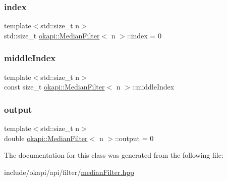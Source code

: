 \mbox{\label{classokapi_1_1MedianFilter_af5188b3df2e2f5cffed1b8b903ce1ef9}} 
\subsubsection{\texorpdfstring{index}{index}}
{\footnotesize\ttfamily template$<$std\+::size\+\_\+t n$>$ \\
std\+::size\+\_\+t \mbox{\hyperlink{classokapi_1_1MedianFilter}{okapi\+::\+Median\+Filter}}$<$ n $>$\+::index = 0\hspace{0.3cm}{\ttfamily [protected]}}

\mbox{\label{classokapi_1_1MedianFilter_a0730bda4e8ae740fc21ed98441d58fb2}} 
\subsubsection{\texorpdfstring{middleIndex}{middleIndex}}
{\footnotesize\ttfamily template$<$std\+::size\+\_\+t n$>$ \\
const size\+\_\+t \mbox{\hyperlink{classokapi_1_1MedianFilter}{okapi\+::\+Median\+Filter}}$<$ n $>$\+::middle\+Index\hspace{0.3cm}{\ttfamily [protected]}}

\mbox{\label{classokapi_1_1MedianFilter_a1cd7af575ee6be29f36a6b920277ef21}} 
\subsubsection{\texorpdfstring{output}{output}}
{\footnotesize\ttfamily template$<$std\+::size\+\_\+t n$>$ \\
double \mbox{\hyperlink{classokapi_1_1MedianFilter}{okapi\+::\+Median\+Filter}}$<$ n $>$\+::output = 0\hspace{0.3cm}{\ttfamily [protected]}}



The documentation for this class was generated from the following file\+:\begin{DoxyCompactItemize}
\item 
include/okapi/api/filter/\mbox{\hyperlink{medianFilter_8hpp}{median\+Filter.\+hpp}}\end{DoxyCompactItemize}

